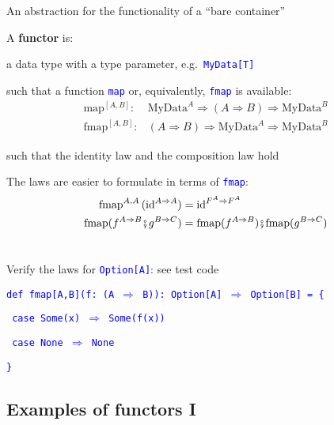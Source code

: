 An abstraction for the functionality of a ``bare container'' 

A \textbf{functor} is:

a data type with a type parameter, e.g.\ \texttt{\textcolor{blue}{\footnotesize{}MyData{[}T{]}}}{\footnotesize\par}

such that a function \texttt{\textcolor{blue}{\footnotesize{}map}}
or, equivalently, \texttt{\textcolor{blue}{\footnotesize{}fmap}} is
available:{\footnotesize{}
\begin{align*}
\text{map}^{[A,B]}:\  & \text{MyData}^{A}\Rightarrow\left(A\Rightarrow B\right)\Rightarrow\text{MyData}^{B}\\
\text{fmap}^{[A,B]}: & \left(A\Rightarrow B\right)\Rightarrow\text{MyData}^{A}\Rightarrow\text{MyData}^{B}
\end{align*}
}{\footnotesize\par}

such that the identity law and the composition law hold

The laws are easier to formulate in terms of \texttt{\textcolor{blue}{\footnotesize{}fmap}}:\texttt{\textcolor{blue}{\footnotesize{}
\begin{align*}
\text{fmap}^{A,A}\,(\text{id}^{A\Rightarrow A}) & =\text{id}^{F^{A}\Rightarrow F^{A}}\\
\text{fmap}(f^{A\Rightarrow B}\bef g^{B\Rightarrow C}) & =\text{fmap}(f^{A\Rightarrow B})\bef\text{fmap}(g^{B\Rightarrow C})
\end{align*}
}}{\footnotesize\par}

Verify the laws for \texttt{\textcolor{blue}{\footnotesize{}Option{[}A{]}}}:
see test code

\texttt{\textcolor{blue}{\footnotesize{}def fmap{[}A,B{]}(f: (A $\Rightarrow$
B)): Option{[}A{]} $\Rightarrow$ Option{[}B{]} = \{}}{\footnotesize\par}

\texttt{\textcolor{blue}{\footnotesize{}  case Some(x) $\Rightarrow$
Some(f(x))}}{\footnotesize\par}

\texttt{\textcolor{blue}{\footnotesize{}  case None $\Rightarrow$
None}}{\footnotesize\par}

\texttt{\textcolor{blue}{\footnotesize{}\}}}{\footnotesize\par}


\subsection{Examples of functors I}

